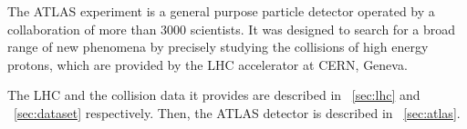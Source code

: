
The ATLAS experiment is a general purpose particle detector operated by a collaboration of 
more than 3000 scientists. It was designed to search for a broad range of new phenomena by 
precisely studying the collisions of high energy protons, which are provided by the 
\ac{LHC} accelerator at CERN, Geneva.

The \ac{LHC} and the \pp collision data it provides are described in \Section~\ref{sec:lhc}
and \Section~\ref{sec:dataset} respectively. Then, the ATLAS detector is described in
\Section~\ref{sec:atlas}.
